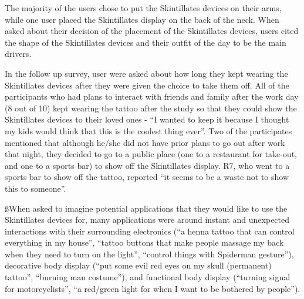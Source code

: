 \documentclass{sigchi}
\begin{document}
The majority of the users chose to put the Skintillates devices on their arms, while one user placed the Skintillates display on the back of the neck. When asked about their decision of the placement of the Skintillates devices, users cited the shape of the Skintillates devices and their outfit of the day to be the main drivers. 

In the follow up survey, user were asked about how long they kept wearing the Skintillates devices after they were given the choice to take them off. All of the participants  who had plans to interact with friends and family after the work day (8 out of 10) kept wearing the tattoo after the study so that they could show the Skintillates devices to their loved ones - ``I wanted to keep it because I thought my kids would think that this is the coolest thing ever''. Two of the participates mentioned that although he/she did not have prior plans to go out after work that night, they decided to go to a public place (one to a restaurant for take-out, and one to a sports bar) to show off the Skintillates display. R7, who went to a sports bar to show off the tattoo, reported ``it seems to be a waste not to show this to someone''. 

ßWhen asked to imagine potential applications that they would like to use the Skintillates devices for, many applications were around instant and unexpected interactions with their surrounding electronics (``a henna tattoo that can control everything in my house'', ``tattoo buttons that make people massage my back when they need to turn on the light'', ``control things with Spiderman gesture''), decorative body display (``put some evil red eyes on my skull (permanent) tattoo'', ``burning man costume''), and functional body display (``turning signal for motorcyclists'', ``a red/green light for when I want to be bothered by people''). 
\end{document}
